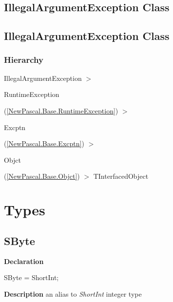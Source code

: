 \documentclass{report}
\newif\ifpdf
\begin{document}
\subsection*{\large{\textbf{IllegalArgumentException Class}}\normalsize\hspace{1ex}\hrulefill}
\else
\subsection*{IllegalArgumentException Class}
\fi
\label{NewPascal.Base.IllegalArgumentException}
\subsubsection*{\large{\textbf{Hierarchy}}\normalsize\hspace{1ex}\hfill}
IllegalArgumentException {$>$} \begin{ttfamily}RuntimeException\end{ttfamily}(\ref{NewPascal.Base.RuntimeException}) {$>$} \begin{ttfamily}Excptn\end{ttfamily}(\ref{NewPascal.Base.Excptn}) {$>$} \begin{ttfamily}Objct\end{ttfamily}(\ref{NewPascal.Base.Objct}) {$>$} 
TInterfacedObject
\section{Types}
\ifpdf
\subsection*{\large{\textbf{SByte}}\normalsize\hspace{1ex}\hrulefill}
\else
\subsection*{SByte}
\fi
\label{NewPascal.Base-SByte}
\begin{list}{}{
\setlength{\itemindent}{0cm}
\setlength{\listparindent}{0cm}
\setlength{\leftmargin}{\evensidemargin}
\addtolength{\leftmargin}{\tmplength}
\settowidth{\labelsep}{X}
\addtolength{\leftmargin}{\labelsep}
\setlength{\labelwidth}{\tmplength}
}
\item[\textbf{Declaration}\hfill]
\ifpdf
\begin{flushleft}
\fi
\begin{ttfamily}
SByte = ShortInt;\end{ttfamily}

\ifpdf
\end{flushleft}
\fi

\par
\item[\textbf{Description}]
an alias to \textit{ShortInt} integer type

\end{list}
\ifpdf
\end{document}

